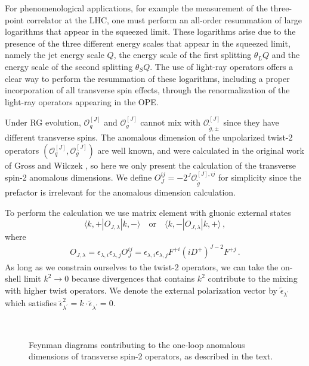 \documentclass[letterpaper,11pt]{article}
\def\beq{\begin{equation}}
\def\eeq{\end{equation}}
\def\beq{\begin{equation}}
\def\eeq{\end{equation}}
\begin{document}
For phenomenological applications, for example the measurement of the three-point correlator at the LHC, one must perform an all-order resummation of large logarithms that appear in the squeezed limit. These logarithms arise due to the presence of the three different energy scales that appear in the squeezed limit, namely the jet energy scale $Q$, the energy scale of the first splitting $\theta_L Q$ and the energy scale of the second splitting $\theta_S Q$. The use of light-ray operators offers a clear way to perform the resummation of these logarithms, including a proper incorporation of all transverse spin effects, through the renormalization of the light-ray operators appearing in the OPE. 



Under RG evolution, $\mathcal{O}_q^{[J]}$ and $\mathcal{O}_g^{[J]}$ cannot mix with $\mathcal{O}_{\tilde{g},\pm}^{[J]}$ since they have different transverse spins. The anomalous dimension of the unpolarized twist-2 operators $(\mathcal{O}_q^{[J]}, \mathcal{O}_g^{[J]})$ are well known, and were calculated  in the original work of Gross and Wilczek \cite{Gross:1974cs,Gross:1973id,Gross:1973ju},  so here we only present the calculation of the transverse spin-2 anomalous dimensions. We define $O_{J}^{ij}=-2^J \mathcal{O}_{\tilde{g}}^{[J],ij}$ for simplicity since the prefactor is irrelevant for the anomalous dimension calculation.

To perform the calculation we use matrix element with gluonic external states 
\beq
\langle k,+| O_{J, \lambda} |k,-\rangle \quad \text{or} \quad \langle k,-| O_{J,\lambda} |k,+\rangle\,,
\eeq
where
\begin{align}
O_{J,\lambda}= \epsilon_{\lambda,i}\epsilon_{\lambda,j} O_{J}^{ij}= \epsilon_{\lambda,i}\epsilon_{\lambda,j} F^{+i}(iD^+)^{J-2}F^{+j}\,.
\end{align}
As long as we constrain ourselves to the twist-2 operators, we can take the on-shell limit $k^2\to 0$ because divergences that contains $k^2$ contribute to the mixing with higher twist operators. We denote the external polarization vector by $\tilde{\epsilon}_{\lambda^\prime}$ which satisfies $\tilde{\epsilon}_{\lambda^\prime}^2=k\cdot\tilde{\epsilon}_{\lambda^\prime}=0$.

\begin{figure}
\centering
{}
\\
\caption{Feynman diagrams contributing to the one-loop anomalous dimensions of transverse spin-2 operators, as described in the text.}
\label{fig: Feynman_Graphs}
\end{figure}
\end{document}
